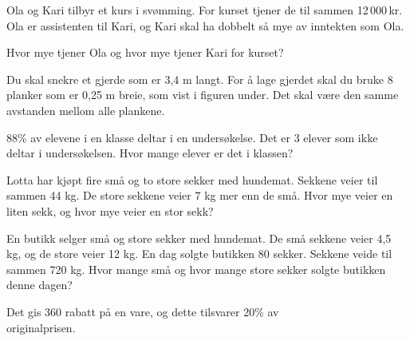 




\opgt

Ola og Kari tilbyr et kurs i svømming. For kurset tjener de til sammen 12\,000\,kr. Ola er assistenten til Kari, og Kari skal ha dobbelt så mye av inntekten som Ola. \os

Hvor mye tjener Ola og hvor mye tjener Kari for kurset?

Du skal snekre et gjerde som er 3,4 m langt. For å lage gjerdet skal du bruke 8 planker som er 0,25 m breie, som vist i figuren under. Det skal være den samme avstanden mellom alle plankene.

 \vs
{}

 \vs
{}

88\% av elevene i en klasse deltar i en undersøkelse.
Det er 3 elever som ikke deltar i undersøkelsen.
Hvor mange elever er det i klassen?

Lotta har kjøpt fire små og to store sekker med hundemat. Sekkene veier til sammen
44 kg. De store sekkene veier 7 kg mer enn de små.
Hvor mye veier en liten sekk, og hvor mye veier en stor sekk?

En butikk selger små og store sekker med hundemat. De små sekkene veier 4,5 kg,
og de store veier 12 kg.
En dag solgte butikken 80 sekker. Sekkene veide til sammen 720 kg.
Hvor mange små og hvor mange store sekker solgte butikken denne dagen?

\newpage
{}
Det gis 360 rabatt på en vare, og dette tilsvarer 20\% av \\ originalprisen.

